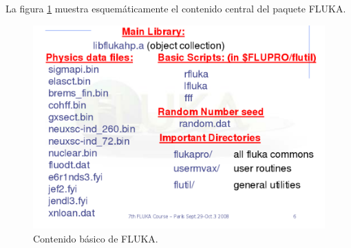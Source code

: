 La figura \ref{figFLUKA} muestra esquemáticamente el contenido central del paquete FLUKA.

\begin{figure}
 \centering
 \includegraphics[width = .75\textwidth]{figures/cap7/fluka.png}
 \caption{Contenido básico de FLUKA.}
 \label{figFLUKA}
\end{figure}

